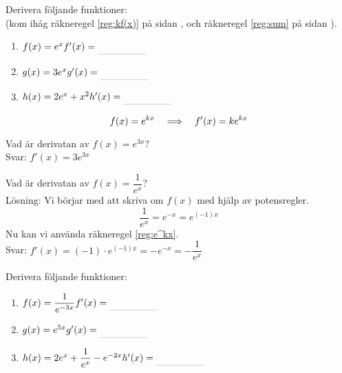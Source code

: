 \documentclass[a4paper, 12pt]{article}
\begin{document}
\begin{uppgifter} 
    Derivera följande funktioner: \\(kom ihåg räkneregel \ref*{reg:kf(x)} på sidan \pageref*{reg:kf(x)}, och räkneregel \ref*{reg:sum} på sidan \pageref*{reg:sum}).
    \begin{multicols}{3}
        \begin{enumerate}
            \item $f(x) = e^x \\ f'(x) \ans$
            \item $g(x) = 3e^x \\ g'(x) \ans$
            \item $h(x) = 2e^x + x^2 \\ h'(x) \ans$
        \end{enumerate}
    \end{multicols}
\end{uppgifter}


\begin{regel}
    \label{reg:e^kx}
    \[ f(x) = e^{kx} \hspace{1em} \Longrightarrow \hspace{1em} f'(x) = ke^{kx} \]
\end{regel}


\begin{exempel}
    Vad är derivatan av $f(x) = e^{3x}$? \\
    Svar: $f'(x) = 3e^{3x}$
\end{exempel}


\begin{exempel}
    Vad är derivatan av $f(x) = \dfrac 1{e^x}$? \\
    Lösning: Vi börjar med att skriva om $f(x)$ med hjälp av potensregler. 
    \[ \frac 1{e^x} = e^{-x} = e^{(-1)x} \]
    Nu kan vi använda räkneregel \ref*{reg:e^kx}. \\
    Svar: $f'(x) = (-1)\cdot e^{(-1)x} = -e^{-x} = -\dfrac 1{e^x}$
\end{exempel}


\begin{uppgifter}
    Derivera följande funktioner:
    \begin{multicols}{3}
        \begin{enumerate}
            \item $f(x) = \dfrac{1}{e^{-3x}} \\ f'(x) \ans$
            \item $g(x) = e^{5x} \\ g'(x) \ans$
            \item $h(x) = 2e^x + \dfrac 1{e^x} - e^{-2x} \\ h'(x) \ans$
        \end{enumerate}
    \end{multicols}
\end{uppgifter}
\end{document}
